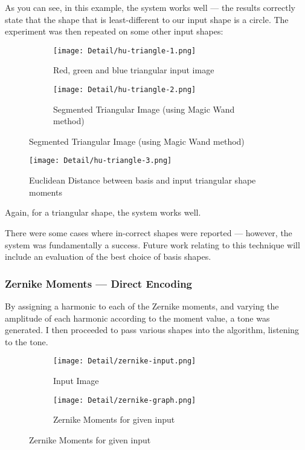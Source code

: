 As you can see, in this example, the system works well --- the results correctly state that the shape that is least-different to our input shape is a circle. The experiment was then repeated on some other input shapes:

\begin{figure}[H]
    \centering
    \begin{subfigure}[h]{0.4\textwidth}
        \centering
        \texttt{[image: Detail/hu-triangle-1.png]}
        \caption{Red, green and blue triangular input image}
    \end{subfigure}
    \begin{subfigure}[h]{0.4\textwidth}
        \centering
        \texttt{[image: Detail/hu-triangle-2.png]}
        \caption{Segmented Triangular Image (using Magic Wand method)}
    \end{subfigure}
\end{figure}

\begin{figure}[H]
    \centering
    \texttt{[image: Detail/hu-triangle-3.png]}
    \caption{Euclidean Distance between basis and input triangular shape moments}
\end{figure}

Again, for a triangular shape, the system works well.

There were some cases where in-correct shapes were reported --- however, the system was fundamentally a success. Future work relating to this technique will include an evaluation of the best choice of basis shapes.

\subsubsection{Zernike Moments --- Direct Encoding}
By assigning a harmonic to each of the Zernike moments, and varying the amplitude of each harmonic according to the moment value, a tone was generated. I then proceeded to pass various shapes into the algorithm, listening to the tone.

\begin{figure}[H]
    \centering
    \begin{subfigure}[h]{0.2\textwidth}
        \centering
        \texttt{[image: Detail/zernike-input.png]}
        \caption{Input Image}
    \end{subfigure}
    \begin{subfigure}[h]{0.7\textwidth}
        \centering
        \texttt{[image: Detail/zernike-graph.png]}
        \caption{Zernike Moments for given input}
    \end{subfigure}
\end{figure}

